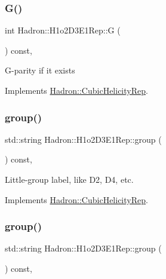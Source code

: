 \subsubsection{\texorpdfstring{G()}{G()}\hspace{0.1cm}{\footnotesize\ttfamily [3/3]}}
{\footnotesize\ttfamily int Hadron\+::\+H1o2\+D3\+E1\+Rep\+::G (\begin{DoxyParamCaption}{ }\end{DoxyParamCaption}) const\hspace{0.3cm}{\ttfamily [inline]}, {\ttfamily [virtual]}}

G-\/parity if it exists 

Implements \mbox{\hyperlink{structHadron_1_1CubicHelicityRep_a50689f42be1e6170aa8cf6ad0597018b}{Hadron\+::\+Cubic\+Helicity\+Rep}}.

\mbox{\label{structHadron_1_1H1o2D3E1Rep_a6c9218517ca2797e0d5ee7e92887a916}} 
\subsubsection{\texorpdfstring{group()}{group()}\hspace{0.1cm}{\footnotesize\ttfamily [1/5]}}
{\footnotesize\ttfamily std\+::string Hadron\+::\+H1o2\+D3\+E1\+Rep\+::group (\begin{DoxyParamCaption}{ }\end{DoxyParamCaption}) const\hspace{0.3cm}{\ttfamily [inline]}, {\ttfamily [virtual]}}

Little-\/group label, like D2, D4, etc. 

Implements \mbox{\hyperlink{structHadron_1_1CubicHelicityRep_a101a7d76cd8ccdad0f272db44b766113}{Hadron\+::\+Cubic\+Helicity\+Rep}}.

\mbox{\label{structHadron_1_1H1o2D3E1Rep_a6c9218517ca2797e0d5ee7e92887a916}} 
\subsubsection{\texorpdfstring{group()}{group()}\hspace{0.1cm}{\footnotesize\ttfamily [2/5]}}
{\footnotesize\ttfamily std\+::string Hadron\+::\+H1o2\+D3\+E1\+Rep\+::group (\begin{DoxyParamCaption}{ }\end{DoxyParamCaption}) const\hspace{0.3cm}{\ttfamily [inline]}, {\ttfamily [virtual]}}

